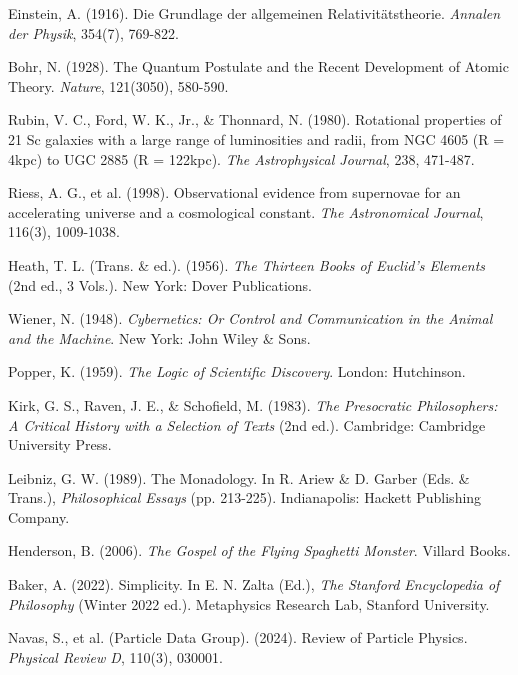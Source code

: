 \documentclass[pdflatex,sn-mathphys-num,referee]{sn-jnl}
\begin{document}
\begin{thebibliography}{99}

Einstein, A. (1916). Die Grundlage der allgemeinen Relativitätstheorie. \textit{Annalen der Physik}, 354(7), 769-822.

Bohr, N. (1928). The Quantum Postulate and the Recent Development of Atomic Theory. \textit{Nature}, 121(3050), 580-590.

Rubin, V. C., Ford, W. K., Jr., \& Thonnard, N. (1980). Rotational properties of 21 Sc galaxies with a large range of luminosities and radii, from NGC 4605 (R = 4kpc) to UGC 2885 (R = 122kpc). \textit{The Astrophysical Journal}, 238, 471-487.

Riess, A. G., et al. (1998). Observational evidence from supernovae for an accelerating universe and a cosmological constant. \textit{The Astronomical Journal}, 116(3), 1009-1038.

Heath, T. L. (Trans. \& ed.). (1956). \textit{The Thirteen Books of Euclid's Elements} (2nd ed., 3 Vols.). New York: Dover Publications.

Wiener, N. (1948). \textit{Cybernetics: Or Control and Communication in the Animal and the Machine}. New York: John Wiley \& Sons.

Popper, K. (1959). \textit{The Logic of Scientific Discovery}. London: Hutchinson.

Kirk, G. S., Raven, J. E., \& Schofield, M. (1983). \textit{The Presocratic Philosophers: A Critical History with a Selection of Texts} (2nd ed.). Cambridge: Cambridge University Press.

Leibniz, G. W. (1989). The Monadology. In R. Ariew \& D. Garber (Eds. \& Trans.), \textit{Philosophical Essays} (pp. 213-225). Indianapolis: Hackett Publishing Company.

Henderson, B. (2006). \textit{The Gospel of the Flying Spaghetti Monster}. Villard Books.

Baker, A. (2022). Simplicity. In E. N. Zalta (Ed.), \textit{The Stanford Encyclopedia of Philosophy} (Winter 2022 ed.). Metaphysics Research Lab, Stanford University.

Navas, S., et al. (Particle Data Group). (2024). Review of Particle Physics. \textit{Physical Review D}, 110(3), 030001.


\end{thebibliography}
\end{document}
